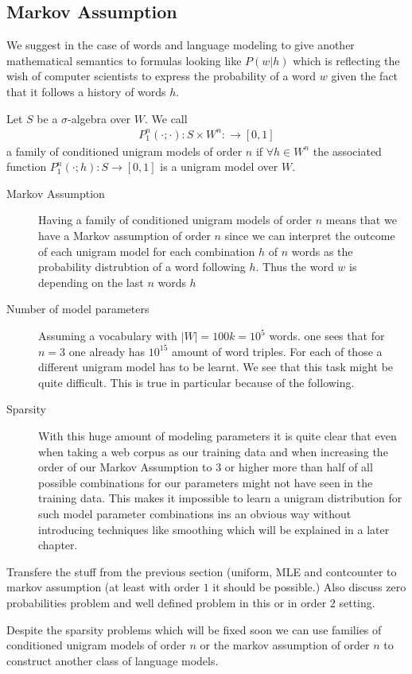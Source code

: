 \documentclass[•]{book}
\begin{document}
\subsection{Markov Assumption}
We suggest in the case of words and language modeling to give another mathematical semantics to formulas looking like $P(w|h)$ which is reflecting the wish of computer scientists to express the probability of a word $w$ given the fact that it follows a history of words $h$. 

\begin{definition}
Let $S$ be a $\sigma$-algebra over $W$.
We call
\begin{align}
P_1^n(\cdot ; \cdot): S\times W^{n}:\longrightarrow [0,1]
\end{align}
a family of conditioned  unigram models of order $n$ if $\forall h\in W^n$ the associated function $P_1^n(\cdot ; h):S\longrightarrow [0,1]$ is a unigram model over $W$. 
\end{definition}
\begin{remark}
\begin{description}
\item[Markov Assumption]  Having a family of conditioned unigram models of order $n$ means that we have a Markov assumption of order $n$ since we can interpret the outcome of each unigram model for each combination $h$ of $n$ words as the probability distrubtion of a word following $h$. Thus the word $w$ is depending on the last $n$ words $h$
\item[Number of model parameters] Assuming a vocabulary with  $|W| = 100k = 10^5$ words. one sees that for $n=3$ one already has $10^{15}$ amount of word triples.  
For each of those a different unigram model has to be learnt.
We see that this task might be quite difficult. This is true in particular because of the following.  
\item[Sparsity] With this huge amount of modeling parameters it is quite clear that even when taking a web corpus as our training data and when increasing the order of our Markov Assumption to $3$ or higher more than half of all possible combinations for our parameters might not have seen in the training data.
This makes it impossible to learn a unigram distribution for such model parameter combinations ins an obvious way without introducing techniques like smoothing which will be explained in a later chapter.
\end{description}
\end{remark}
\begin{example}
Transfere the stuff from the previous section (uniform, MLE and contcounter to markov assumption (at least with order $1$ it should be possible.) Also discuss zero probabilities problem and well defined problem in this or in order $2$ setting. 
\end{example}
Despite the sparsity problems which will be fixed soon we can use families of conditioned unigram models of order $n$ or the markov assumption of order $n$ to construct another class of language models.  
\end{document}
